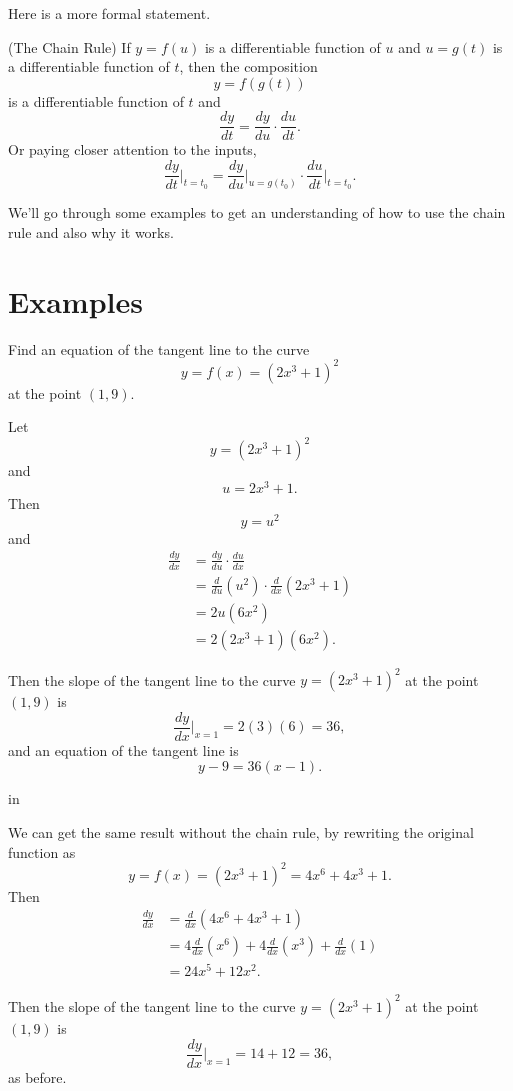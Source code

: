 \documentclass{ximera}
\newcommand{\pskip}{\vskip 0.1 in}
\begin{document}
Here is a more formal statement.

\begin{theorem}
(The Chain Rule) If $y=f(u)$ is a differentiable function of $u$ and $u=g(t)$ is a differentiable function of $t$, then the composition
\[
      y = f(g(t))
\]
is a differentiable function of $t$ and
\[
   \frac{dy}{dt} = \frac{dy}{du} \cdot \frac{du}{dt} .
\]
Or paying closer attention to the inputs,
\[
      \frac{dy}{dt}\Big|_{t=t_0} = \frac{dy}{du}\Big|_{u=g(t_0)} \cdot \frac{du}{dt}\Big|_{t=t_0} . 
\]

\end{theorem}


We'll go through some examples to get an understanding of how to use the chain rule and also why it works.


\section*{Examples}

\begin{example}  \label{Ex:GDFGDFGff}
Find an equation of the tangent line to the curve
\[
  y = f(x) = \left( 2x^3 +1  \right)^2
\]
at the point $(1,9)$.

\begin{explanation}
Let 
\[
       y = \left( 2x^3 +1  \right)^2
\]
and 
\[
      u = 2x^3 + 1 .
\]
Then
\[
     y = u^2
\]
and
\begin{align*}
\frac{dy}{dx} &= \frac{dy}{du} \cdot \frac{du}{dx}  \\
                     &= \frac{d}{du} \left( u^2 \right)  \cdot \frac{d}{dx}\left(  2x^3 + 1 \right)  \\
                     &= 2u (6x^2)  \\
                     &= 2(2x^3+1)(6x^2) .
\end{align*}

Then the slope of the tangent line to the curve $y=(2x^3+1)^2$ at the point $(1,9)$ is 
\[
              \frac{dy}{dx}\Big|_{x=1} = 2(3)(6) = 36 ,
\]
and an equation of the tangent line is
\[
   y - 9 = 36(x-1) .
\]

\pskip 

We can get the same result without the chain rule, by rewriting the original function as
\[
     y = f(x) = (2x^3+1)^2 = 4x^6 + 4x^3 + 1.
\] 
Then
\begin{align*}
      \frac{dy}{dx} &= \frac{d}{dx} \left(  4x^6 + 4x^3 + 1  \right) \\
                         &= 4\frac{d}{dx}\left( x^6 \right) + 4 \frac{d}{dx}\left( x^3 \right) + \frac{d}{dx}\left(1 \right) \\
                        &=   24x^5 + 12x^2 .
\end{align*}

Then the slope of the tangent line to the curve $y=(2x^3+1)^2$ at the point $(1,9)$ is 
\[
              \frac{dy}{dx}\Big|_{x=1} =14 + 12 = 36 ,
\]
as before.

\end{explanation}
\end{example}
\end{document}
